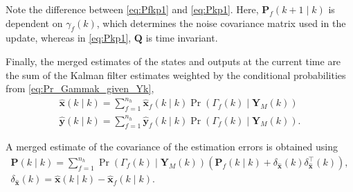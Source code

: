 {Note the difference between \eqref{eq:Pfkp1} and \eqref{eq:Pkp1}.  Here, $\mathbf{P}_f(k+1 \mid k)$ is dependent on $\gamma_f(k)$, which determines the noise covariance matrix used in the update, whereas in \eqref{eq:Pkp1}, $\mathbf{Q}$ is time invariant.

Finally, the merged estimates of the states and outputs at the current time are the sum of the Kalman filter estimates weighted by the conditional probabilities from \eqref{eq:Pr_Gammak_given_Yk},
\begin{equation} \label{eq:xkyk_hat_MKF}
	\begin{aligned}
		\mathbf{\hat{x}}(k \mid k) = \sum_{f=1}^{n_h} \mathbf{\hat{x}}_f(k \mid k) \Pr(\Gamma_f(k) \mid \mathbf{Y}_M(k)) \\
		\mathbf{\hat{y}}(k \mid k) = \sum_{f=1}^{n_h} \mathbf{\hat{y}}_f(k \mid k) \Pr(\Gamma_f(k) \mid \mathbf{Y}_M(k)).
	\end{aligned}
\end{equation}

A merged estimate of the covariance of the estimation errors is obtained using
\begin{equation} \label{eq:Pk_MKF}
	\begin{aligned}
	\mathbf{P}(k \mid k) = \sum_{f=1}^{n_h} \Pr(\Gamma_f(k) \mid \mathbf{Y}_M(k)) \left( \mathbf{P}_f(k \mid k) + \delta_\mathbf{\hat{x}}(k) \delta_\mathbf{\hat{x}}^\intercal(k) \right), \\
	\delta_\mathbf{\hat{x}}(k) = \mathbf{\hat{x}}(k \mid k) - \mathbf{\hat{x}}_f(k \mid k).
	\end{aligned}
\end{equation}

}
